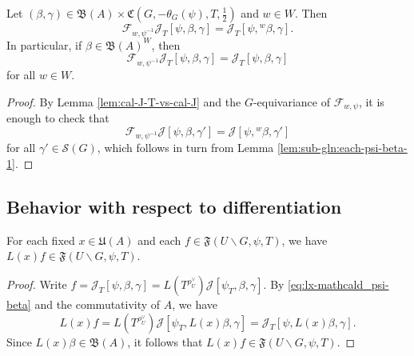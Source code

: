 \begin{lemma}\label{lem:each-f-in}
  Let $(\beta,\gamma) \in \mathfrak{B}(A) \times \mathfrak{C}(G,-\theta_G(\psi),T,\tfrac{1}{2})$ and $w \in W$.  Then
  \begin{equation*}
    \mathcal{F}_{w,\psi^{-1} } \mathcal{J}_T[\psi,\beta,\gamma]
    = \mathcal{J}_T[\psi,{}^w \beta, \gamma].
  \end{equation*}
  In particular, if $\beta \in \mathfrak{B}(A)^W$, then
  \begin{equation*}
    \mathcal{F}_{w,\psi^{-1} } \mathcal{J}_T[\psi,\beta,\gamma]
    = \mathcal{J}_T[\psi,\beta,\gamma]
  \end{equation*}
  for all $w \in W$.
\end{lemma}
\begin{proof}
  By Lemma \ref{lem:cal-J-T-vs-cal-J} and the $G$-equivariance of $\mathcal{F}_{w,\psi}$, it is enough to check that
  \begin{equation*}
    \mathcal{F}_{w,\psi^{-1}} \mathcal{J}[\psi,\beta, \gamma' ]
    =
    \mathcal{J}[{\psi,{}^w \beta, \gamma' }]
  \end{equation*}
  for all $\gamma ' \in \mathcal{S}(G)$, which follows in turn from Lemma \ref{lem:sub-gln:each-psi-beta-1}.
\end{proof}




\subsection{Behavior with respect to differentiation}


\begin{lemma}\label{lem:standard:each-fixed-x}
  For each fixed $x \in \mathfrak{U}(A)$ and each $f \in \mathfrak{F}(U \backslash G, \psi, T)$, we have $L(x) f \in \mathfrak{F}(U \backslash G, \psi, T)$.
\end{lemma}
\begin{proof}
  Write $f = \mathcal{J}_T[\psi,\beta,\gamma] = L(T^{\rho_U^\vee}) \mathcal{J}[\psi_T,\beta,\gamma]$.  By \eqref{eq:lx-mathcald_psi-beta} and the commutativity of $A$, we have
  \begin{equation*}
    L(x) f = L(T^{\rho_U^\vee}) \mathcal{J}[\psi_T, L(x) \beta, \gamma] = \mathcal{J}_T[\psi,L(x) \beta,\gamma].
  \end{equation*}
  Since $L(x) \beta \in \mathfrak{B}(A)$, it follows that $L(x) f \in \mathfrak{F}(U \backslash G, \psi, T)$.
\end{proof}

